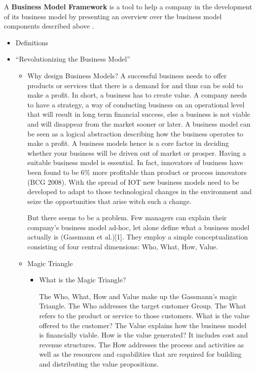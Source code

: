 	 A \textbf{Business Model Framework} is a tool to help a company in the development of its business model by presenting an overview over the business model components described above \cite{dijkman}.
	\begin{itemize}
		\item Definitions
		\item ``Revolutionizing the Business Model''
			\cite{gassmann}
			\begin{itemize}
				\item Why design Business Models?
				A successful business needs to offer products or services that there is a demand for and thus can be sold to make a profit. In short, a business has to create value. A company needs to have a strategy, a way of conducting business on an operational level that will result in long term financial success, else a business is not viable and will disappear from the market sooner or later.
				A business model can be seen as a logical abstraction describing how the business operates to make a profit. A business models hence is a core factor in deciding whether your business will be driven out of market or prosper. Having a suitable business model is essential. In fact, innovators of business have been found to be 6\% more profitable than product or process innovators (BCG 2008). With the spread of IOT new business models need to be developed to adapt to those technological changes in the environment and seize the opportunities that arise witch such a change. 

				But there seems to be a problem. Few managers can explain their company's business model ad-hoc, let alone define what a business model actually is (Gassmann et al.)[1]. They employ a simple conceptualization consisting of four central dimensions: Who, What, How, Value. 
				\item Magic Triangle 

				\begin{itemize}
					\item What is the Magic Triangle?

					The Who, What, How and Value make up the Gassmann's magic Triangle. 
					The Who addresses the target customer Group. 
					The What refers to the product or service to those customers. What is the value offered to the customer? 
					The Value explains how the business model is financially viable. How is the value generated? It includes cost and revenue structures.
					The How addresses the process and activities as well as the resources and capabilities that are required for building and distributing the value propositions.
					

\end{itemize}
\end{itemize}
\end{itemize}

